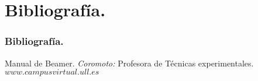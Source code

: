\documentclass{beamer}
\begin{document}
  \section{Bibliografía.}

    \begin{frame}
      \frametitle{Bibliografía.}
	\begin{thebibliography}{99}
	  Manual de Beamer. \emph{Coromoto:} Profesora de Técnicas experimentales.
	  \small{$www.campusvirtual.ull.es$}
	\end{thebibliography}
    \end{frame}
\end{document}
